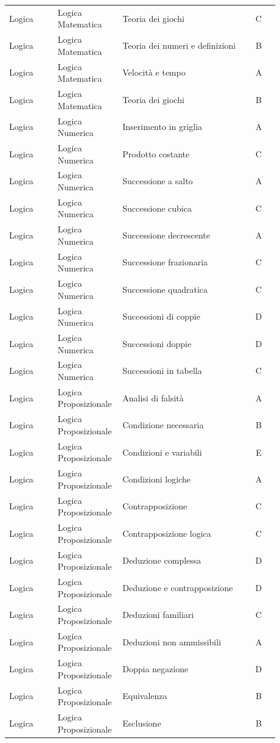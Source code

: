 \documentclass[20pt, a4paper]{article}
\begin{document}
\begin{longtable}{@{}>{\raggedright\arraybackslash}p{0.18\linewidth}>{\raggedright\arraybackslash}p{0.24\linewidth}>{\raggedright\arraybackslash}p{0.46\linewidth}c@{}}
Logica & Logica Matematica & Teoria dei giochi & C \\
Logica & Logica Matematica & Teoria dei numeri e definizioni & B \\
Logica & Logica Matematica & Velocità e tempo & A \\
Logica & Logica Matematica & Teoria dei giochi & B \\
Logica & Logica Numerica & Inserimento in griglia & A \\
Logica & Logica Numerica & Prodotto costante & C \\
Logica & Logica Numerica & Successione a salto & A \\
Logica & Logica Numerica & Successione cubica & C \\
Logica & Logica Numerica & Successione decrescente & A \\
Logica & Logica Numerica & Successione frazionaria & C \\
Logica & Logica Numerica & Successione quadratica & C \\
Logica & Logica Numerica & Successioni di coppie & D \\
Logica & Logica Numerica & Successioni doppie & D \\
Logica & Logica Numerica & Successioni in tabella & C \\
Logica & Logica Proposizionale & Analisi di falsità & A \\
Logica & Logica Proposizionale & Condizione necessaria & B \\
Logica & Logica Proposizionale & Condizioni e variabili & E \\
Logica & Logica Proposizionale & Condizioni logiche & A \\
Logica & Logica Proposizionale & Contrapposizione & C \\
Logica & Logica Proposizionale & Contrapposizione logica & C \\
Logica & Logica Proposizionale & Deduzione complessa & D \\
Logica & Logica Proposizionale & Deduzione e contrapposizione & D \\
Logica & Logica Proposizionale & Deduzioni familiari & C \\
Logica & Logica Proposizionale & Deduzioni non ammissibili & A \\
Logica & Logica Proposizionale & Doppia negazione & D \\
Logica & Logica Proposizionale & Equivalenza & B \\
Logica & Logica Proposizionale & Esclusione & B \\

\end{longtable}
\end{document}

